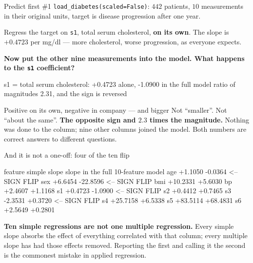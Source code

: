 \documentclass[aspectratio=169]{beamer}
\begin{document}
\begin{frame}[fragile,shrink=8]{Predict first \#1}
\texttt{load\_diabetes(scaled=False)}: $442$ patients, $10$ measurements in
their original units, target is disease progression after one year.

Regress the target on \texttt{s1}, total serum cholesterol, \textbf{on its
own}. The slope is $\mathbf{+0.4723}$ per mg/dl --- more cholesterol, worse
progression, as everyone expects.

\begin{center}
  \textbf{Now put the other nine measurements into the model.
  What happens to the \texttt{s1} coefficient?}
\end{center}
\vspace{0.2em}
\begin{outblk}
s1 = total serum cholesterol: +0.4723 alone, -1.0900 in the full model
ratio of magnitudes 2.31, and the sign is reversed
\end{outblk}
\begin{alertblock}{Positive on its own, negative in company --- and bigger}
  \footnotesize Not ``smaller''. Not ``about the same''. \textbf{The opposite
  sign and $2.3$ times the magnitude.} Nothing was done to the column; nine
  other columns joined the model. Both numbers are correct answers to
  different questions.
\end{alertblock}
\end{frame}

\begin{frame}[fragile,shrink=8]{And it is not a one-off: four of the ten flip}
\begin{outblk}
feature   simple slope   slope in the full 10-feature model
age            +1.1050                -0.0364  <-- SIGN FLIP
sex            +6.6454               -22.8596  <-- SIGN FLIP
bmi           +10.2331                +5.6030
bp             +2.4607                +1.1168
s1             +0.4723                -1.0900  <-- SIGN FLIP
s2             +0.4412                +0.7465
s3             -2.3531                +0.3720  <-- SIGN FLIP
s4            +25.7158                +6.5338
s5            +83.5114               +68.4831
s6             +2.5649                +0.2801
\end{outblk}
\begin{center}\small
  \textbf{Ten simple regressions are not one multiple regression.} Every
  simple slope absorbs the effect of everything correlated with that column;
  every multiple slope has had those effects removed. Reporting the first and
  calling it the second is the commonest mistake in applied regression.
\end{center}
\end{frame}
\end{document}
